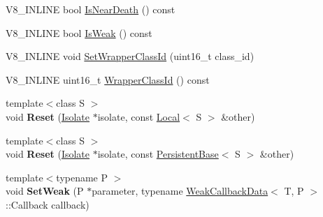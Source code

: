 \begin{DoxyCompactItemize}
\item 
V8\+\_\+\+I\+N\+L\+I\+NE bool \hyperlink{classv8_1_1PersistentBase_a4a64c26d91ed6a276aa8a7ca4bb7683a}{Is\+Near\+Death} () const 
\item 
V8\+\_\+\+I\+N\+L\+I\+NE bool \hyperlink{classv8_1_1PersistentBase_a714b7794149df483837a2c6b09d52396}{Is\+Weak} () const 
\item 
V8\+\_\+\+I\+N\+L\+I\+NE void \hyperlink{classv8_1_1PersistentBase_ac4c979164b3ed4dc92319e6f5a108d3d}{Set\+Wrapper\+Class\+Id} (uint16\+\_\+t class\+\_\+id)
\item 
V8\+\_\+\+I\+N\+L\+I\+NE uint16\+\_\+t \hyperlink{classv8_1_1PersistentBase_a01a46bf4e69ed9a837639702ee234643}{Wrapper\+Class\+Id} () const 
\item 
{\footnotesize template$<$class S $>$ }\\void {\bfseries Reset} (\hyperlink{classv8_1_1Isolate}{Isolate} $\ast$isolate, const \hyperlink{classv8_1_1Local}{Local}$<$ S $>$ \&other)\hypertarget{classv8_1_1PersistentBase_ab4b4d3fba3498486f1f10dc7d5be90fc}{}\label{classv8_1_1PersistentBase_ab4b4d3fba3498486f1f10dc7d5be90fc}

\item 
{\footnotesize template$<$class S $>$ }\\void {\bfseries Reset} (\hyperlink{classv8_1_1Isolate}{Isolate} $\ast$isolate, const \hyperlink{classv8_1_1PersistentBase}{Persistent\+Base}$<$ S $>$ \&other)\hypertarget{classv8_1_1PersistentBase_a67cbcedf77d176d3870fa4993e300b61}{}\label{classv8_1_1PersistentBase_a67cbcedf77d176d3870fa4993e300b61}

\item 
{\footnotesize template$<$typename P $>$ }\\void {\bfseries Set\+Weak} (P $\ast$parameter, typename \hyperlink{classv8_1_1WeakCallbackData}{Weak\+Callback\+Data}$<$ T, P $>$\+::Callback callback)\hypertarget{classv8_1_1PersistentBase_aaf342ece1a4ba926ba62e8d6af7be777}{}\label{classv8_1_1PersistentBase_aaf342ece1a4ba926ba62e8d6af7be777}

\end{DoxyCompactItemize}
